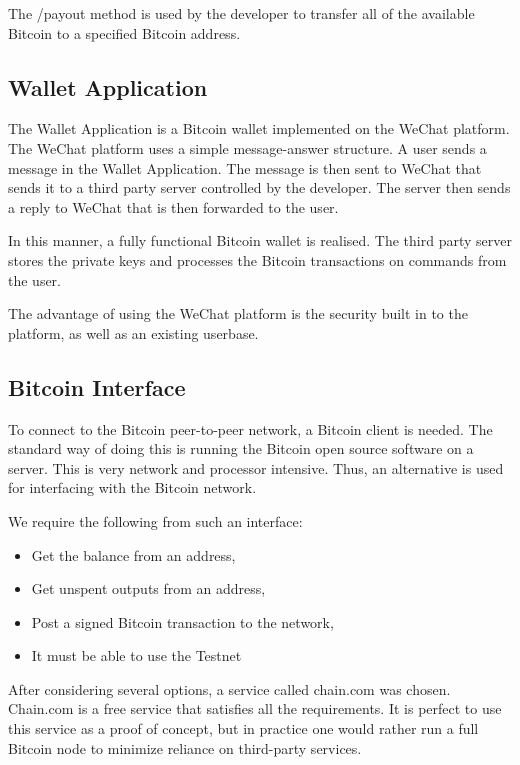The /payout method is used by the developer to transfer all of the available Bitcoin to a specified Bitcoin address.

\subsection{Wallet Application}

The Wallet Application is a Bitcoin wallet implemented on the WeChat platform. The WeChat platform uses a simple message-answer structure. A user sends a message in the Wallet Application. The message is then sent to WeChat that sends it to a third party server controlled by the developer. The server then sends a reply to WeChat that is then forwarded to the user. 

In this manner, a fully functional Bitcoin wallet is realised. The third party server stores the private keys and processes the Bitcoin transactions on commands from the user.

The advantage of using the WeChat platform is the security built in to the platform, as well as an existing userbase. 

\subsection{Bitcoin Interface}

To connect to the Bitcoin peer-to-peer network, a Bitcoin client is needed. The standard way of doing this is running the Bitcoin open source software on a server. This is very network and processor intensive. Thus, an alternative is used for interfacing with the Bitcoin network. 

We require the following from such an interface:

\begin{itemize}
	\item Get the balance from an address,
	\item Get unspent outputs from an address,
	\item Post a signed Bitcoin transaction to the network,
	\item It must be able to use the Testnet
\end{itemize}

After considering several options, a service called chain.com was chosen. Chain.com is a free service that satisfies all the requirements. It is perfect to use this service as a proof of concept, but in practice one would rather run a full Bitcoin node to minimize reliance on third-party services.

